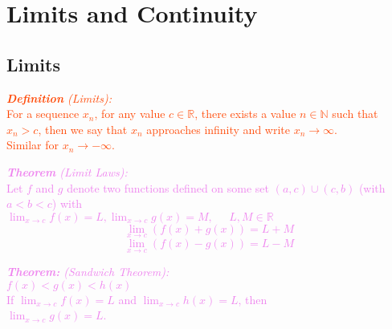 \documentclass{report}
\newenvironment{definition}[1][OrangeRed]
  {\begin{tcolorbox}[colframe=#1,colback=white]}
  {\end{tcolorbox}}
\newenvironment{theorem}[1][Violet]
  {\begin{tcolorbox}[colframe=#1,colback=white]}
  {\end{tcolorbox}}
\begin{document}
\chapter{Limits and Continuity}
\section{Limits}

\begin{definition}
    \textcolor{OrangeRed}{\textit{\textbf{Definition} (Limits):}\\
   For a sequence $x_n$, for any value $c \in \mathbb{R}$, there exists a value $n \in \mathbb{N}$ such that $x_n > c$, then we say that $x_n$ approaches infinity and write $x_n \longrightarrow \infty$.\\
   Similar for $x_n \longrightarrow -\infty$.}
\end{definition}

\begin{theorem}
    \textcolor{Violet}{\textit{\textbf{Theorem} (Limit Laws):}\\
    Let $f$ and $g$ denote two functions defined on some set $(a,c) \cup (c,b)$ (with $a < b < c$) with\\
    $\lim_{x\to c} f(x) = L, \lim_{x \to c} g(x) = M, \; \; \; \; \;L, M \in \mathbb{R}$
    \begin{equation}
        \lim_{x \to c} (f(x) + g(x)) = L + M
    \end{equation}
    \begin{equation}
        \lim_{x \to c} (f(x) - g(x)) = L - M
    \end{equation}}
\end{theorem}

\begin{theorem}
    \textcolor{Violet}{\textit{\textbf{Theorem:} (Sandwich Theorem):}\\
    $f(x) < g(x) < h(x)$\\
    If $\lim_{x \to c} f(x) = L$ and $\lim_{x \to c} h(x) = L$, then\\
    $\lim_{x \to c} g(x) = L$.}
\end{theorem}
\end{document}
